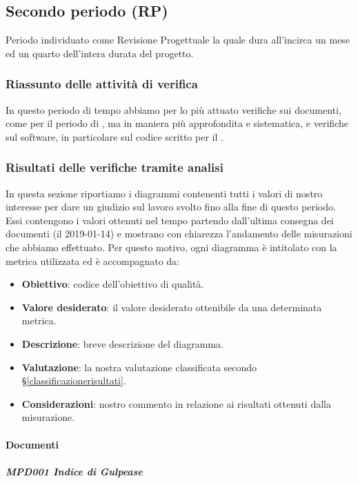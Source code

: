 	\subsection{Secondo periodo (RP)}
	Periodo individuato come Revisione Progettuale la quale dura all'incirca un mese ed un quarto dell'intera durata del progetto.
	
	\subsubsection{Riassunto delle attività di verifica}
	In questo periodo di tempo abbiamo per lo più attuato verifiche sui documenti, come per il periodo di \RR, ma in maniera più approfondita e  sistematica, e verifiche sul software, in particolare sul codice scritto per il .

	
	\subsubsection{Risultati delle verifiche tramite analisi}
	In questa sezione riportiamo i diagrammi contenenti tutti i valori di nostro interesse per dare un giudizio sul lavoro svolto fino alla fine di questo periodo.
	Essi contengono i valori ottenuti nel tempo partendo dall'ultima consegna dei documenti (il 2019-01-14) e mostrano con chiarezza l'andamento delle misurazioni che abbiamo effettuato.
	Per questo motivo, ogni diagramma è intitolato con la metrica utilizzata ed è accompagnato da:
	\begin{itemize}
		\item \textbf{Obiettivo}: codice dell'obiettivo di qualità.
		\item \textbf{Valore desiderato}: il valore desiderato ottenibile da una determinata metrica.
		\item \textbf{Descrizione}: breve descrizione del diagramma.
		\item \textbf{Valutazione}: la nostra valutazione classificata secondo \S\ref{classificazionerisultati}.
		\item \textbf{Considerazioni}: nostro commento in relazione ai risultati ottenuti dalla misurazione.
	\end{itemize}


	\paragraph{Documenti}

	\subparagraph{MPD001 Indice di Gulpease}

